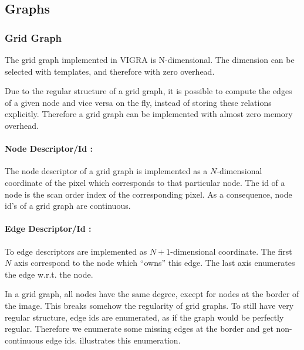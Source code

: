 \subsection{Graphs}

\subsubsection{Grid Graph} \label{sec:graphs_grid_graph}

The grid graph implemented in VIGRA is N-dimensional.
The dimension can be selected with templates, and therefore with zero
overhead.

Due to the regular structure of a grid graph, it is possible to compute the edges of a given 
node and vice versa on the fly, instead of storing these relations explicitly.
Therefore a grid graph can be implemented with almost zero memory overhead.

\paragraph{Node Descriptor/Id :}
The node descriptor of a grid graph is implemented as a
$N$-dimensional coordinate of the pixel which corresponds to
that particular node. The id of a node is the scan order index
of the corresponding pixel.
As a consequence, node id's of a grid graph are continuous.
\paragraph{Edge Descriptor/Id :}
To edge descriptors are implemented as $N+1$-dimensional coordinate.
The first $N$ axis correspond to the node which ``owns'' this edge.
The last axis enumerates the edge w.r.t. the node.

In a grid graph, all nodes have the same degree, except for nodes
at the border of the image.
This breaks somehow the regularity of grid graphs.
To still have very regular structure, edge ids
are enumerated, as if the graph would be perfectly
regular. Therefore we enumerate some missing edges
at the border and get non-continuous edge ids.
 illustrates this enumeration.



